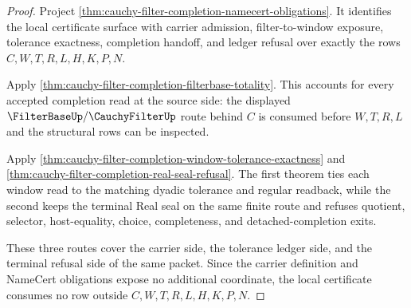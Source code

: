 \begin{proof}
Project \autoref{thm:cauchy-filter-completion-namecert-obligations}. It identifies the local certificate surface with carrier admission, filter-to-window exposure, tolerance exactness, completion handoff, and ledger refusal over exactly the rows $C,W,T,R,L,H,K,P,N$.

Apply \autoref{thm:cauchy-filter-completion-filterbase-totality}. This accounts for every accepted completion read at the source side: the displayed $\FilterBaseUp/\CauchyFilterUp$ route behind $C$ is consumed before $W,T,R,L$ and the structural rows can be inspected.

Apply \autoref{thm:cauchy-filter-completion-window-tolerance-exactness} and \autoref{thm:cauchy-filter-completion-real-seal-refusal}. The first theorem ties each window read to the matching dyadic tolerance and regular readback, while the second keeps the terminal Real seal on the same finite route and refuses quotient, selector, host-equality, choice, completeness, and detached-completion exits.

These three routes cover the carrier side, the tolerance ledger side, and the terminal refusal side of the same packet. Since the carrier definition and NameCert obligations expose no additional coordinate, the local certificate consumes no row outside $C,W,T,R,L,H,K,P,N$.
\end{proof}

